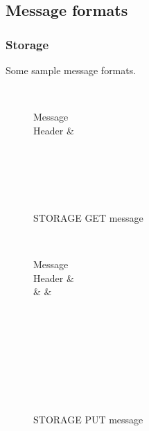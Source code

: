 \documentclass[a4paper, 11pt]{article}
\begin{document}
\subsection*{Message formats}

\subsubsection*{Storage}

Some sample message formats.

\begin{figure}[H]
	\centering
	\begin{bytefield}[bitwidth=0.8em]{32}
		 \\
		\begin{rightwordgroup}{Message \\  Header}
			 & 
		\end{rightwordgroup} \\
		 \\
		\skippedwords \\
		 \\
	\end{bytefield}
	\caption{STORAGE GET message}
	\label{STORAGEGET}
\end{figure}

\begin{figure}[H]
	\centering
	\begin{bytefield}[bitwidth=0.8em]{32}
		 \\
		\begin{rightwordgroup}{Message \\  Header}
			 &  \\
			 &  & 
		\end{rightwordgroup} \\
		 \\
		\skippedwords \\
		 \\
		 \\
		\skippedwords \\
		 \\
	\end{bytefield}
	\caption{STORAGE PUT message}
	\label{STORAGEPUT}
\end{figure}
\end{document}
